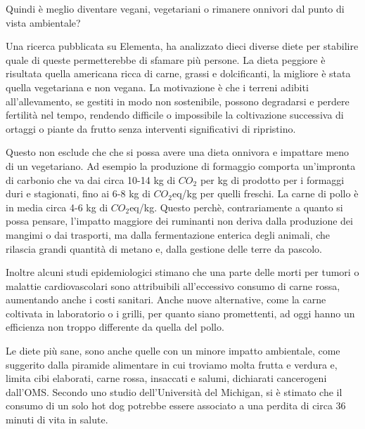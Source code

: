 \documentclass[12pt]{book} %
\begin{document}
Quindi è meglio diventare vegani, vegetariani o rimanere onnivori dal punto di vista ambientale?

Una ricerca pubblicata su Elementa, ha analizzato dieci diverse diete per stabilire quale di queste permetterebbe di sfamare più persone. La dieta peggiore è risultata quella americana ricca di carne, grassi e dolcificanti, la migliore è stata quella vegetariana e non vegana. La motivazione è che i terreni adibiti all'allevamento, se gestiti in modo non sostenibile, possono degradarsi e perdere fertilità nel tempo, rendendo difficile o impossibile la coltivazione successiva di ortaggi o piante da frutto senza interventi significativi di ripristino.

Questo non esclude che che si possa avere una dieta onnivora e impattare meno di un vegetariano. Ad esempio la produzione di formaggio comporta un'impronta di carbonio che va dai circa 10-14 kg di $CO_2$ per kg di prodotto per i formaggi duri e stagionati, fino ai 6-8 kg di $CO_2$eq/kg per quelli freschi. La carne di pollo è in media circa 4-6 kg di $CO_2$eq/kg. Questo perchè, contrariamente a quanto si possa pensare, l'impatto maggiore dei ruminanti non deriva dalla produzione dei mangimi o dai trasporti, ma dalla fermentazione enterica degli animali, che rilascia grandi quantità di metano e, dalla gestione delle terre da pascolo.

Inoltre alcuni studi epidemiologici stimano che una parte delle morti per tumori o malattie cardiovascolari sono attribuibili all’eccessivo consumo di carne rossa, aumentando anche i costi sanitari.
Anche nuove alternative, come la carne coltivata in laboratorio o i grilli, per quanto siano promettenti, ad oggi hanno un efficienza non troppo differente da quella del pollo.

Le diete più sane, sono anche quelle con un minore impatto ambientale, come suggerito dalla piramide alimentare in cui troviamo molta frutta e verdura e, limita cibi elaborati, carne rossa, insaccati e salumi, dichiarati cancerogeni dall'OMS. Secondo uno studio dell'Università del Michigan, si è stimato che il consumo di un solo hot dog potrebbe essere associato a una perdita di circa 36 minuti di vita in salute.
\end{document}
